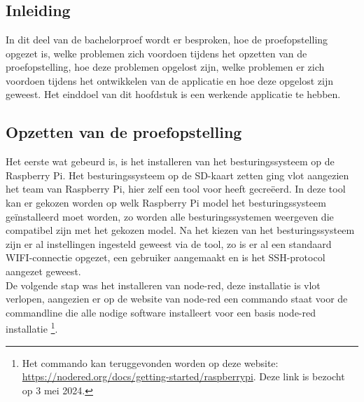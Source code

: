 \chapter{}
\label{ch:proefopstelling}

\section{Inleiding}
\label{sec:proefopstelling-inleiding}

In dit deel van de bachelorproef wordt er besproken, hoe de proefopstelling opgezet is, welke problemen zich voordoen tijdens het opzetten van de proefopstelling, hoe deze problemen opgelost zijn, welke problemen er zich voordoen tijdens het ontwikkelen van de applicatie en hoe deze opgelost zijn geweest. Het einddoel van dit hoofdstuk is een werkende applicatie te hebben.

\section{Opzetten van de proefopstelling}
\label{sec:proefopstelling-opzetten}

Het eerste wat gebeurd is, is het installeren van het besturingssysteem op de Raspberry Pi. Het besturingssysteem op de SD-kaart zetten ging vlot aangezien het team van Raspberry Pi, hier zelf een tool voor heeft gecreëerd. In deze tool kan er gekozen worden op welk Raspberry Pi model het besturingssysteem geïnstalleerd moet worden, zo worden alle besturingssystemen weergeven die compatibel zijn met het gekozen model. Na het kiezen van het besturingssysteem zijn er al instellingen ingesteld geweest via de tool, zo is er al een standaard WIFI-connectie opgezet, een gebruiker aangemaakt en is het SSH-protocol aangezet geweest.\\

De volgende stap was het installeren van node-red, deze installatie is vlot verlopen, aangezien er op de website van node-red een commando staat voor de commandline die alle nodige software installeert voor een basis node-red installatie \footnote{Het commando kan teruggevonden worden op deze website: \url{https://nodered.org/docs/getting-started/raspberrypi}. Deze link is bezocht op 3 mei 2024.}.